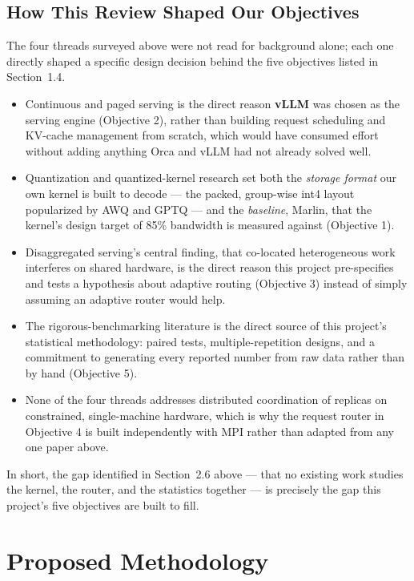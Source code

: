 \documentclass[11pt,a4paper]{article}
\begin{document}
\subsection{How This Review Shaped Our Objectives}
The four threads surveyed above were not read for background alone; each one directly shaped a specific design
decision behind the five objectives listed in Section~1.4.
\begin{itemize}[leftmargin=1.4em, itemsep=6pt]
  \item Continuous and paged serving is the direct reason \textbf{vLLM} was chosen as the serving engine (Objective
        2), rather than building request scheduling and KV-cache management from scratch, which would have consumed
        effort without adding anything Orca and vLLM had not already solved well.
  \item Quantization and quantized-kernel research set both the \emph{storage format} our own kernel is built to
        decode --- the packed, group-wise int4 layout popularized by AWQ and GPTQ --- and the \emph{baseline},
        Marlin, that the kernel's design target of 85\% bandwidth is measured against (Objective 1).
  \item Disaggregated serving's central finding, that co-located heterogeneous work interferes on shared hardware,
        is the direct reason this project pre-specifies and tests a hypothesis about adaptive routing (Objective 3)
        instead of simply assuming an adaptive router would help.
  \item The rigorous-benchmarking literature is the direct source of this project's statistical methodology:
        paired tests, multiple-repetition designs, and a commitment to generating every reported number from raw
        data rather than by hand (Objective 5).
  \item None of the four threads addresses distributed coordination of replicas on constrained, single-machine
        hardware, which is why the request router in Objective 4 is built independently with MPI rather than adapted
        from any one paper above.
\end{itemize}
In short, the gap identified in Section~2.6 above --- that no existing work studies the kernel, the router, and the
statistics together --- is precisely the gap this project's five objectives are built to fill.

\section{Proposed Methodology}
\label{sec:method}
\end{document}

